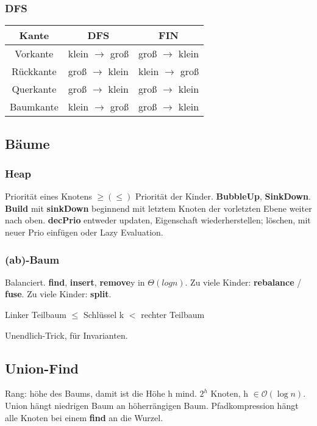 \documentclass[11pt, a4paper, twoside]{article}
\begin{document}
\begin{multicols}{2}
\end{multicols}

\newpage

\begin{multicols}{2}

    \subsubsection{DFS}

    \begin{tabular}{c || c | c}
        Kante & DFS & FIN \\
        \hline
        Vorkante & klein $\rightarrow$ groß & groß $\rightarrow$ klein \\
        Rückkante & groß $\rightarrow$ klein & klein $\rightarrow$ groß \\
        Querkante & groß $\rightarrow$ klein & groß $\rightarrow$ klein \\
        Baumkante & klein $\rightarrow$ groß & groß $\rightarrow$ klein \\
    \end{tabular}
    \subsection{Bäume}
    \subsubsection{Heap}
    Priorität eines Knotens $\geq (\leq)$ Priorität der Kinder.
    \textbf{BubbleUp}, \textbf{SinkDown}. \textbf{Build} mit \textbf{sinkDown} 
    beginnend mit letztem Knoten der vorletzten Ebene weiter nach oben.
    \textbf{decPrio} entweder updaten, Eigenschaft wiederherstellen; löschen,
    mit neuer Prio einfügen oder Lazy Evaluation.

    \subsubsection{(ab)-Baum}
    Balanciert. \textbf{find}, \textbf{insert}, \textbf{remove}y in 
    $\Theta(log n)$. Zu viele Kinder: \textbf{rebalance} / \textbf{fuse}. 
    Zu viele Kinder: \textbf{split}. 

    Linker Teilbaum $\leq$ Schlüssel k $<$ rechter Teilbaum

    Unendlich-Trick, für Invarianten.  

    \subsection{Union-Find}
    Rang: höhe des Baums, damit ist die Höhe h mind. $2^h$ Knoten, h $\in
    \mathcal{O}(\log n)$. 
    Union hängt niedrigen Baum an höherrängigen Baum. Pfadkompression hängt alle
    Knoten bei einem \textbf{find} an die Wurzel. 



\end{multicols}
\end{document}
